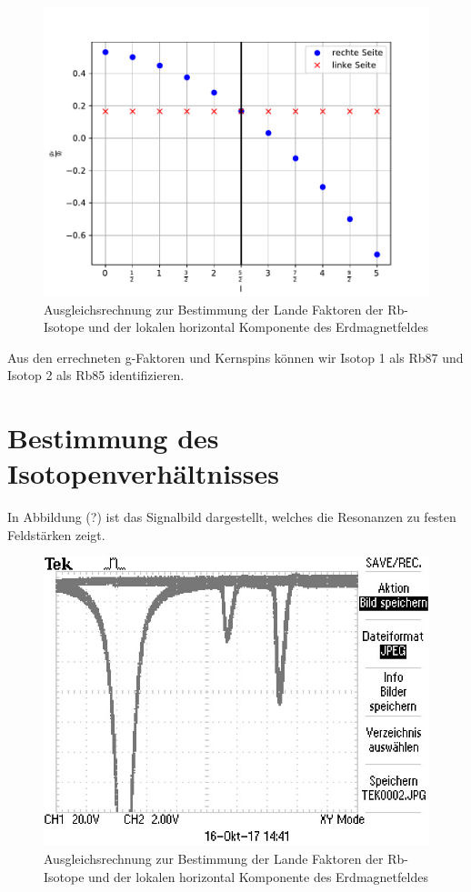 \begin{figure}[H]
\centering
\includegraphics[scale=0.8]{./optischesPumpen/img/coreSpin2.pdf}
\caption{Ausgleichsrechnung zur Bestimmung der Lande Faktoren der Rb-Isotope und der lokalen horizontal Komponente des Erdmagnetfeldes}
\label{aufbau}
\end{figure}

Aus den errechneten g-Faktoren und Kernspins können wir Isotop 1 als Rb87 und Isotop 2 als Rb85 identifizieren.


\section{Bestimmung des Isotopenverhältnisses}
In Abbildung (?) ist das Signalbild dargestellt, welches die Resonanzen zu festen
Feldstärken zeigt.

\begin{figure}[H]
\centering
\includegraphics[scale=0.8]{./optischesPumpen/img/TEK0002.JPG}
\caption{Ausgleichsrechnung zur Bestimmung der Lande Faktoren der Rb-Isotope und der lokalen horizontal Komponente des Erdmagnetfeldes}
\label{aufbau}
\end{figure}



